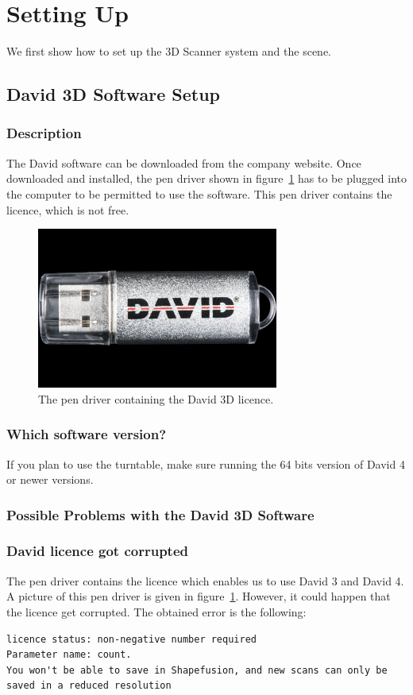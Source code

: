 \documentclass[11pt]{article}
\begin{document}
\section{Setting Up}
We first show how to set up the 3D Scanner system and the scene.
\subsection{David 3D Software Setup}
\subsubsection{Description}
The David software can be downloaded from the company website.
Once downloaded and installed, the pen driver shown in figure~\ref{fig:penDriver} has to be plugged into the computer to be permitted to use the software.
This pen driver contains the licence, which is not free.

\begin{figure}[h]
\begin{center}
 		\includegraphics[width=6 cm]{images/licence.png}
 	\end{center}
 	\caption{The pen driver containing the David 3D licence.}
 	\label{fig:penDriver}
\end{figure}

\subsubsection{Which software version?}
If you plan to use the turntable, make sure running the 64 bits version of David 4 or newer versions.

\subsubsection{Possible Problems with the David 3D Software}
\subsubsection{David licence got corrupted}
The pen driver contains the licence which enables us to use David 3 and David 4.
A picture of this pen driver is given in figure~\ref{fig:penDriver}.
However, it could happen that the licence get corrupted.
The obtained error is the following:
\begin{verbatim}
licence status: non-negative number required
Parameter name: count.
You won't be able to save in Shapefusion, and new scans can only be saved in a reduced resolution
\end{verbatim}
\end{document}
